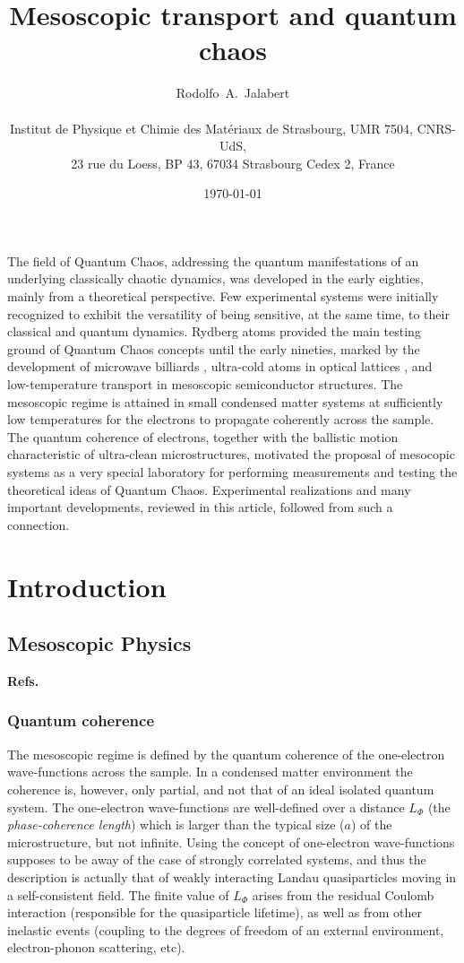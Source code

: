 \documentclass[a4paper,10pt]{article}
\title{Mesoscopic transport and quantum chaos}
\author{Rodolfo~A.~Jalabert
  \\ \vspace{-0.3cm}\\ 
    {\small Institut de Physique et Chimie des Mat{\'e}riaux de Strasbourg,  	UMR 7504, CNRS-UdS,}\\ {\small 23 rue du Loess, BP 43, 67034 Strasbourg
    Cedex 2, France}}
\date{\today}
\newcommand{\nin}{\noindent}
\begin{document}
\maketitle

\nin The field of Quantum Chaos, addressing the quantum manifestations of an underlying classically chaotic dynamics, was developed in the early eighties, mainly from a theoretical perspective. Few experimental systems were initially recognized to exhibit the versatility of being sensitive, at the same time, to their classical and quantum dynamics. Rydberg atoms \cite{Shep12} provided the main testing ground of Quantum Chaos concepts until the early nineties, marked by the development of microwave billiards \cite{Stoc10}, ultra-cold atoms in optical lattices \cite{Raiz11}, and low-temperature transport in mesoscopic semiconductor structures. The mesoscopic regime is attained in small condensed matter systems at sufficiently low temperatures for the electrons to propagate coherently across the sample. The quantum coherence of electrons, together with the ballistic motion characteristic of ultra-clean microstructures, motivated the proposal \cite{Jal90} of mesocopic systems as a very special laboratory for performing measurements 
and testing the theoretical ideas of Quantum Chaos. Experimental realizations \cite{Mar92} and many important developments, reviewed in this article, followed from such a connection. 


\section{Introduction}

\subsection{Mesoscopic Physics}

{\bf Refs.~\cite{LesHou94,Datta,Imry}}

\subsubsection{Quantum coherence}

The mesoscopic regime is defined by the quantum coherence of the one-electron wave-functions across the sample. In a condensed matter environment the coherence is, however, only partial, and not that of an ideal isolated quantum system. The one-electron wave-functions are well-defined over a distance $L_{\Phi}$ (the {\it phase-coherence length}) which is larger than the typical size ($a$) of the microstructure, but not infinite. Using the concept of one-electron wave-functions supposes to be away of the case of strongly correlated systems, and thus the description is actually that of weakly interacting Landau quasiparticles moving in a self-consistent field. The finite value of $L_{\Phi}$ arises from the residual Coulomb interaction (responsible for the quasiparticle lifetime), as well as from other inelastic events (coupling to the degrees of freedom of an external environment, electron-phonon scattering, etc).   
\end{document}
